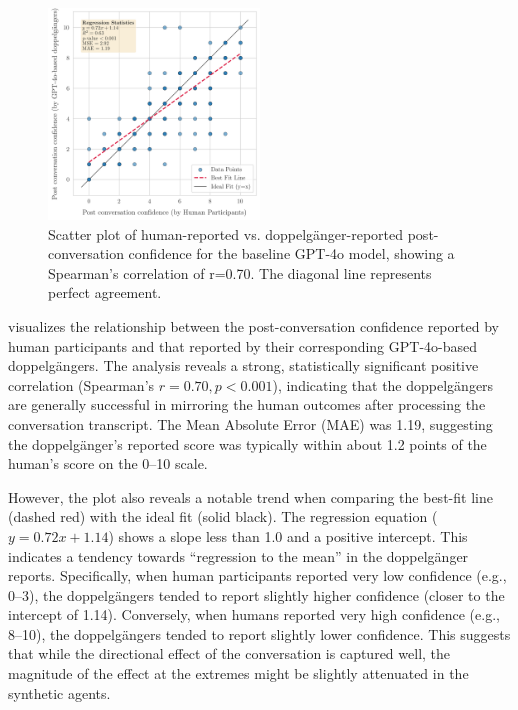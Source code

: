 \begin{figure}[htpb]
	\centering
	\includegraphics[width=0.5\textwidth]{fig/post_conf_gpt4o_vs_human.png}
	\caption[Scatter plot of human-reported vs. doppelgänger-reported post-conversation confidence]{Scatter plot of human-reported vs. doppelgänger-reported post-conversation confidence for the baseline GPT-4o model, showing a Spearman's correlation of r=0.70. The diagonal line represents perfect agreement.}
	\label{fig:post-conf-gpt4o-vs-human}
\end{figure}


 visualizes the relationship between the post-conversation confidence reported by human participants and that reported by their corresponding GPT-4o-based doppelgängers. The analysis reveals a strong, statistically significant positive correlation (Spearman's $r=0.70, p < 0.001$), indicating that the doppelgängers are generally successful in mirroring the human outcomes after processing the conversation transcript. The Mean Absolute Error (MAE) was 1.19, suggesting the doppelgänger's reported score was typically within about 1.2 points of the human's score on the 0--10 scale.

However, the plot also reveals a notable trend when comparing the best-fit line (dashed red) with the ideal fit (solid black). The regression equation ($y=0.72x+1.14$) shows a slope less than 1.0 and a positive intercept. This indicates a tendency towards ``regression to the mean'' in the doppelgänger reports. Specifically, when human participants reported very low confidence (e.g., 0--3), the doppelgängers tended to report slightly higher confidence (closer to the intercept of 1.14). Conversely, when humans reported very high confidence (e.g., 8--10), the doppelgängers tended to report slightly lower confidence. This suggests that while the directional effect of the conversation is captured well, the magnitude of the effect at the extremes might be slightly attenuated in the synthetic agents.

